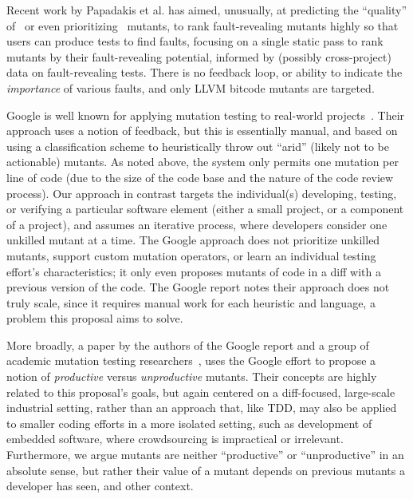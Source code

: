 Recent work by Papadakis et al. has
aimed, unusually, at predicting the ``quality'' of~\cite{MutQuality}
or even prioritizing~\cite{FaRM} mutants, to rank fault-revealing
mutants highly so that users can produce tests to find faults, focusing on a single static
pass to rank mutants by their fault-revealing potential, informed by
(possibly cross-project)
data on fault-revealing tests.  There is no feedback loop, or ability
to indicate the \emph{importance} of various faults, and only LLVM
bitcode mutants are targeted.  %

Google is well known for applying mutation
testing to real-world projects~\cite{MutGoogle}.  Their approach 
uses a notion of feedback, but this is  essentially manual, and based on
using a classification scheme to heuristically throw out ``arid''
(likely not to be actionable)
mutants. As noted above, the system only permits one mutation per line of code
(due to the size of the code base and the nature of the code review process). 
Our approach in contrast targets the individual(s) developing, testing, or verifying a particular software
element (either a small project, or a component of a project), and
assumes an iterative process, where developers consider one unkilled
mutant at a time.  The Google approach does not prioritize
unkilled mutants, support custom mutation
operators, or learn an individual testing effort's characteristics; it only even
proposes mutants of code in a diff with a previous version of the
code.  
The Google report
notes their approach does not truly scale, since it
requires manual work for each heuristic and language, a
problem this proposal aims to solve.

More broadly, a paper by the
authors of the Google report and a group of academic mutation testing
researchers~\cite{ivankovic2018industrial}, uses the Google effort to
propose a notion of \emph{productive} versus \emph{unproductive} mutants.  Their
concepts are highly related to this proposal's goals, but again centered on a
diff-focused, large-scale industrial setting, rather than an approach
that, like TDD, may also be applied to smaller coding efforts in a more
isolated setting, such as development of embedded software, where
crowdsourcing is impractical or irrelevant.  
Furthermore, we argue mutants
are neither ``productive'' or ``unproductive'' in an absolute sense, but
rather their value of a mutant depends on previous mutants a
developer has seen, and other context.



